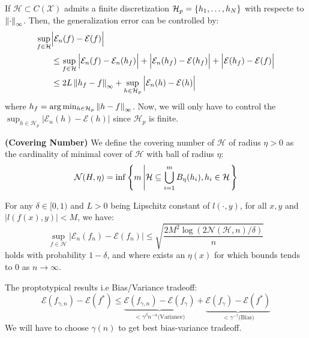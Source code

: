 \begin{remark}
    If $\mathcal{H}\subset C(\mathcal{X})$ admits a finite discretization $\mathcal{H}_p=\left\{ h_1,\dots,h_N \right\}$ with respecte to $\left\lVert\cdot\right\rVert_\infty$. Then, the generalization error can be controlled by:
    \begin{equation*}
    \begin{aligned}
        \sup_{f\in\mathcal{H}} &\Big| \mathcal{E}_n(f)-\mathcal{E}(f) \Big|  \\
        &\le \sup_{f\in\mathcal{H}}\Big| \mathcal{E}_n(f) - \mathcal{E}_n(h_f) \Big| + \Big|\mathcal{E}_n(h_f) - \mathcal{E}(h_f)\Big| + \Big|\mathcal{E}(h_f) - \mathcal{E}(f)\Big| \\
        &\le 2L\left\lVert h_f - f\right\rVert_\infty + \sup_{h\in\mathcal{H}_p}\Big| \mathcal{E}_n(h) - \mathcal{E}(h) \Big|
    \end{aligned}
    \end{equation*}
    where $h_f = \arg\min_{h\in\mathcal{H}_p}\left\lVert h-f\right\rVert_\infty$. Now, we will only have to control the $\sup_{h\in\mathcal{H}_p}| \mathcal{E}_n(h) - \mathcal{E}(h)|$ since $\mathcal{H}_p$ is finite.
\end{remark}

\begin{definition}{\textbf{(Covering Number)}}
    We define the covering number of $ \mathcal{H} $ of radius $\eta>0$ as the cardinality of minimal cover of $\mathcal{H}$ with ball of radius $\eta$:
    \begin{equation*}
        \mathcal{N}(H, \eta) = \inf\left\{ m \left| \mathcal{H} \subseteq \bigcup^m_{i=1} B_\eta(h_i), h_i \in \mathcal{H} \right. \right\}
    \end{equation*}
\end{definition}

\begin{theorem}
    For any $\delta\in[0, 1)$ and $L>0$ being Lipschitz constant of $l(\cdot, y)$, for all $x, y$ and $|l(f(x), y)|<M$, we have:
    \begin{equation*}
        \sup_{f\in\mathcal{H}}\Big| \mathcal{E}_n(f_n) - \mathcal{E}(f_n) \Big| \le \sqrt{\frac{2M^2\log(2\mathcal{N}(\mathcal{H}, n)/\delta)}{n}} 
    \end{equation*}
    holds with probability $1-\delta$, and where exists an $\eta(x)$ for which bounds tends to $0$ as $n\rightarrow\infty$.
\end{theorem}

\begin{remark}
    The proptotypical results i.e Bias/Variance tradeoff:
    \begin{equation*}
        \mathcal{E}(f_{\gamma, n}) - \mathcal{E}(f^*) \le \underbrace{\mathcal{E}(f_{\gamma, n}) - \mathcal{E}(f_\gamma)}_{<\gamma^\beta n^{-\alpha} \text{(Variance)}} + \underbrace{\mathcal{E}(f_\gamma) - \mathcal{E}(f^*)}_{<\gamma^{-\tau}\text{(Bias)}}
    \end{equation*}
    We will have to choose $\gamma(n)$ to get best bias-variance tradeoff.
\end{remark}


